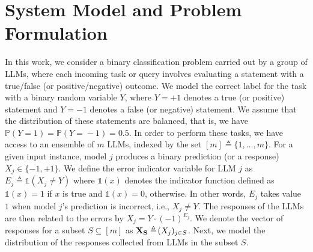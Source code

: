 \documentclass{article}
\theoremstyle{plain}
\theoremstyle{definition}
\theoremstyle{remark}
\begin{document}
\section{System Model and Problem Formulation}
\label{sec:system_model}%
In this work, we consider a binary classification problem carried out by a group of LLMs, where each incoming task or query involves evaluating a statement with a true/false (or positive/negative) outcome. We model the correct label for the task with a binary random variable $Y$, where $Y=+1$ denotes a true (or positive) statement and $Y=-1$ denotes a false (or negative) statement. We assume that the distribution of these statements are balanced, that is, we have $\mathbb{P}(Y=1) \!=\! \mathbb{P}(Y\!=\!-1) = 0.5$. In order to perform these tasks, we have access to an ensemble of $m$ LLMs, indexed by the set $[m] \triangleq \{1, \dots, m\}$.
For a given input instance, model $j$ produces a binary prediction (or a response) $X_j\in \{-1,+1\}$. We define the error indicator variable for LLM $j$ as $E_j \triangleq \mathds{1}(X_j \neq Y)$ where $\mathds{1}(x)$ denotes the indicator function defined as $\mathds{1}(x) = 1$ if $x$ is true and $\mathds{1}(x) = 0$, otherwise. In other words, $E_j$ takes value $1$ when model $j$'s prediction is incorrect, i.e., $X_j \neq Y$. The responses of the LLMs are then related to the errors by $X_j \!=\! Y \!\cdot \!(-1)^{E_j}\!$. We denote the vector of responses for a subset $S \!\subseteq \![m]$ as ${\bf X_S}\triangleq\! (X_j)_{j \in S}$. Next, we model the distribution of the responses collected from LLMs in the subset $S$.    
\end{document}
